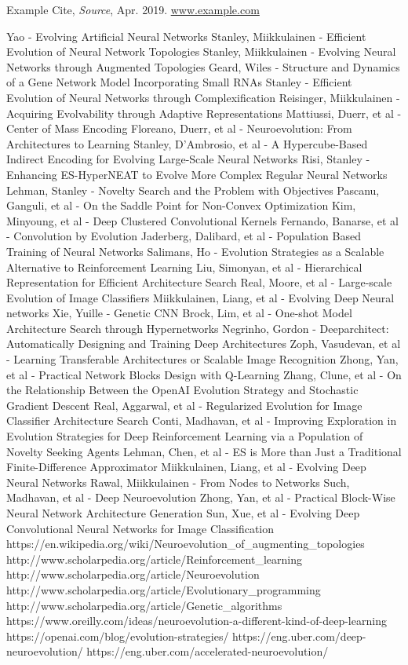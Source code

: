 \documentclass[journal, a4paper]{IEEEtran}
\begin{document}
\begin{thebibliography}{5}

    Example Cite, {\em Source}, Apr. 2019.
    \url{www.example.com}



Yao - Evolving Artificial Neural Networks
Stanley, Miikkulainen - Efficient Evolution of Neural Network Topologies
Stanley, Miikkulainen - Evolving Neural Networks through Augmented Topologies
Geard, Wiles - Structure and Dynamics of a Gene Network Model Incorporating Small RNAs
Stanley - Efficient Evolution of Neural Networks through Complexification
Reisinger, Miikkulainen - Acquiring Evolvability through Adaptive Representations
Mattiussi, Duerr, et al - Center of Mass Encoding
Floreano, Duerr, et al - Neuroevolution: From Architectures to Learning
Stanley, D’Ambrosio, et al - A Hypercube-Based Indirect Encoding for Evolving Large-Scale Neural Networks
Risi, Stanley - Enhancing ES-HyperNEAT to Evolve More Complex Regular Neural Networks
Lehman, Stanley - Novelty Search and the Problem with Objectives
Pascanu, Ganguli, et al - On the Saddle Point for Non-Convex Optimization
Kim, Minyoung, et al - Deep Clustered Convolutional Kernels
Fernando, Banarse, et al - Convolution by Evolution
Jaderberg, Dalibard, et al - Population Based Training of Neural Networks
Salimans, Ho - Evolution Strategies as a Scalable Alternative to Reinforcement Learning
Liu, Simonyan, et al - Hierarchical Representation for Efficient Architecture Search
Real, Moore, et al - Large-scale Evolution of Image Classifiers
Miikkulainen, Liang, et al -  Evolving Deep Neural networks
Xie, Yuille - Genetic CNN
Brock, Lim, et al - One-shot Model Architecture Search through Hypernetworks
Negrinho, Gordon - Deeparchitect: Automatically Designing and Training Deep Architectures
Zoph, Vasudevan, et al - Learning Transferable Architectures or Scalable Image Recognition
Zhong, Yan, et al - Practical Network Blocks Design with Q-Learning
Zhang, Clune, et al - On the Relationship Between the OpenAI Evolution Strategy and Stochastic Gradient Descent
Real, Aggarwal, et al - Regularized Evolution for Image Classifier Architecture Search
Conti, Madhavan, et al - Improving Exploration in Evolution Strategies for Deep Reinforcement Learning via a Population of Novelty Seeking Agents
Lehman, Chen, et al - ES is More than Just a Traditional Finite-Difference Approximator
Miikkulainen, Liang, et al - Evolving Deep Neural Networks
Rawal, Miikkulainen - From Nodes to Networks
Such, Madhavan, et al - Deep Neuroevolution
Zhong, Yan, et al - Practical Block-Wise Neural Network Architecture Generation
Sun, Xue, et al - Evolving Deep Convolutional Neural Networks for Image Classification
https://en.wikipedia.org/wiki/Neuroevolution_of_augmenting_topologies
http://www.scholarpedia.org/article/Reinforcement_learning
http://www.scholarpedia.org/article/Neuroevolution
http://www.scholarpedia.org/article/Evolutionary_programming
http://www.scholarpedia.org/article/Genetic_algorithms
https://www.oreilly.com/ideas/neuroevolution-a-different-kind-of-deep-learning
https://openai.com/blog/evolution-strategies/
https://eng.uber.com/deep-neuroevolution/
https://eng.uber.com/accelerated-neuroevolution/




\end{thebibliography}
\end{document}
